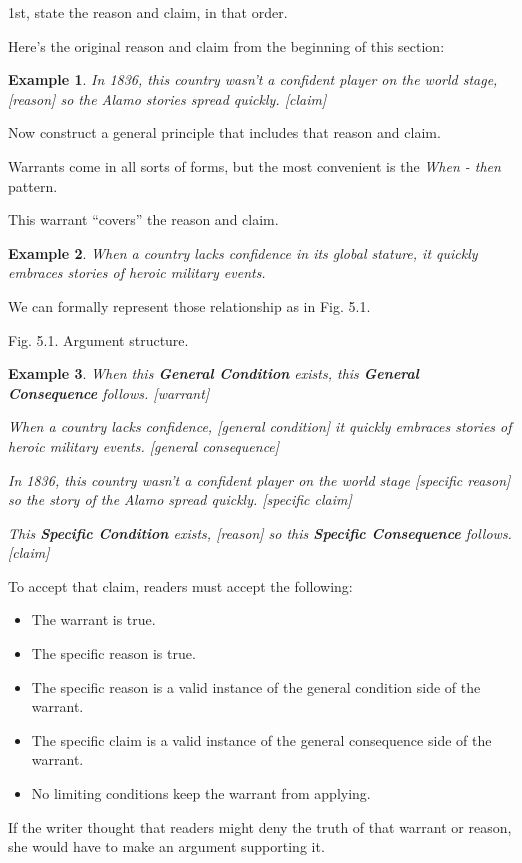 \documentclass[oneside]{book}
\numberwithin{equation}{section}
\newtheorem{example}{Example}[section]
\begin{document}
1st, state the reason and claim, in that order.

Here's the original reason and claim from the beginning of this section:
\begin{example}
    In 1836, this country wasn't a confident player on the world stage, \emph{[reason]} so the Alamo stories spread quickly. \emph{[claim]}
\end{example}
Now construct a general principle that includes that reason and claim.

Warrants come in all sorts of forms, but the most convenient is the \textit{When - then} pattern.

This warrant ``covers'' the reason and claim.
\begin{example}
    When a country lacks confidence in its global stature, it quickly embraces stories of heroic military events.
\end{example}
We can formally represent those relationship as in Fig. 5.1.

\textsf{Fig. 5.1. Argument structure.}
\begin{example}
    When this \textbf{General Condition} exists, this \textbf{General Consequence} follows. \emph{[warrant]}
    
    When a country lacks confidence, \emph{[general condition]} it quickly embraces stories of heroic military events. \emph{[general consequence]}
    
    In 1836, this country wasn't a confident player on the world stage \emph{[specific reason]} so the story of the Alamo spread quickly. \emph{[specific claim]}
    
    This \textbf{Specific Condition} exists, \emph{[reason]} so this \textbf{Specific Consequence} follows. \emph{[claim]}
\end{example}
To accept that claim, readers must accept the following:
\begin{itemize}
    \item The warrant is true.
    \item The specific reason is true.
    \item The specific reason is a valid instance of the general condition side of the warrant.
    \item The specific claim is a valid instance of the general consequence side of the warrant.
    \item No limiting conditions keep the warrant from applying.
\end{itemize}
If the writer thought that readers might deny the truth of that warrant or reason, she would have to make an argument supporting it.
\end{document}
